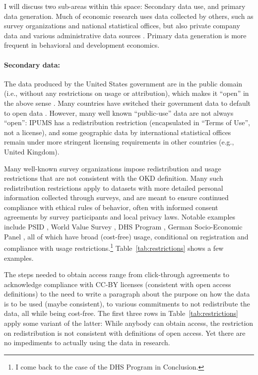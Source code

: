 \documentclass{article}
\begin{document}
I will discuss two sub-areas within this space: Secondary data use, and primary data generation. Much of economic research uses data collected by others, such as survey organizations and national statistical offices, but also private company data and various administrative data sources \citep[``organic data'', ][]{groves_designed_2011,groves_three_2011}. Primary data generation is more frequent in behavioral and development economics. 

\paragraph{Secondary data:} The data produced by the United States government are in the public domain (i.e., without any restrictions on usage or attribution), which makes it ``open'' in the above sense \citep[Copyright Act of 1976, ][]{wikipedia_copyright_2025}. Many countries have switched their government data to default to open data \parencite{statistics_canada_statistics_2012,uk_government_open_2014}. However, many well known ``public-use'' data are not always ``open'': IPUMS has a redistribution restriction (encapsulated in ``Terms of Use'', not a license), and some geographic data by international statistical offices remain under more stringent licensing requirements in other countries (e.g., United Kingdom). 

Many well-known survey organizations impose redistribution and usage restrictions that are not consistent with the OKD definition. Many such redistribution restrictions apply to datasets with more detailed personal information collected through surveys, and are meant to ensure continued compliance with ethical rules of behavior, often with informed consent agreements by survey participants and local privacy laws. Notable examples include  PSID \parencite{institute_for_social_research_panel_2024}, World Value Survey \parencite{haerpfer_world_2024}, \ac{DHS} Program \parencite{dhs_program_demographic_2024}, German Socio-Economic Panel \parencite{goebel_german_2019,goebel_socio-economic_2024}, all of which have broad (cost-free) usage, conditional on registration and compliance with usage restrictions.\footnote{I come back to the case of the \ac{DHS} Program in Conclusion.} Table~\ref{tab:restrictions} shows a few examples. 



The steps needed to obtain access range from click-through agreements to acknowledge compliance with CC-BY licenses (consistent with open access definitions) to the need to write a paragraph about the purpose on how the data is to be used (maybe consistent), to various commitments to not redistribute the data, all while being cost-free. The first three rows in Table~\ref{tab:restrictions} apply some variant of the latter: While anybody can obtain access, the restriction on redistribution is not consistent with definitions of open access. Yet there are no impediments to actually using the data in research. 
\end{document}
